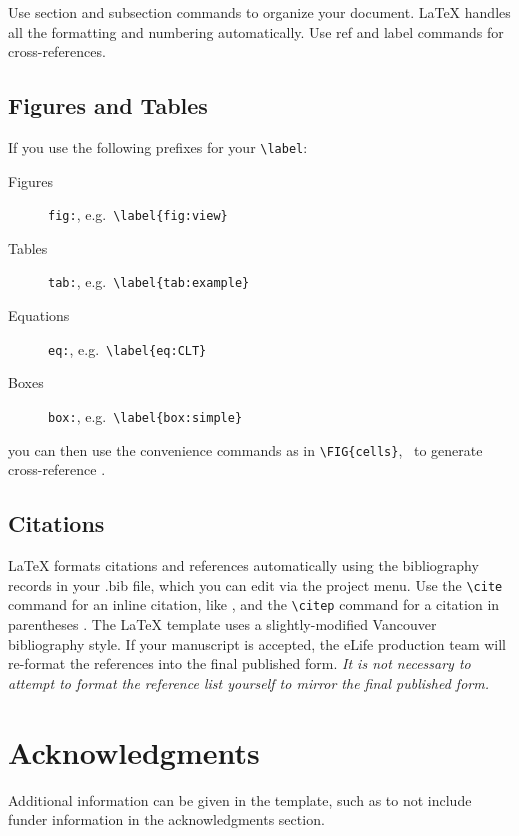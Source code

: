 \documentclass[9pt,lineno]{elife}
\begin{document}
Use section and subsection commands to organize your document. 
\LaTeX{} handles all the formatting and numbering automatically. 
Use ref and label commands for cross-references.

\subsection{Figures and Tables}


If you use the following prefixes for your \verb|\label|:
%
\begin{description}
\item[Figures] \texttt{fig:}, e.g.~\verb|\label{fig:view}|
\item[Tables] \texttt{tab:}, e.g.~\verb|\label{tab:example}|
\item[Equations] \texttt{eq:}, e.g.~\verb|\label{eq:CLT}|
\item[Boxes] \texttt{box:}, e.g.~\verb|\label{box:simple}|
\end{description}
%
you can then use the convenience commands as in \verb|\FIG{cells}|, \ to generate cross-reference . 

\subsection{Citations}

LaTeX formats citations and references automatically using the bibliography records in your .bib file, which you can edit via the project menu. 
Use the \verb|\cite| command for an inline citation, like \cite{trapnell2014pseudo}, and the \verb|\citep| command for a citation in parentheses \citep{trapnell2014pseudo}. 
The LaTeX template uses a slightly-modified Vancouver bibliography style. 
If your manuscript is accepted, the eLife production team will re-format the references into the final published form. 
\emph{It is not necessary to attempt to format the reference list yourself to mirror the final published form.}


\section{Acknowledgments}

Additional information can be given in the template, such as to not include funder information in the acknowledgments section.

\nocite{*} %

\end{document}
